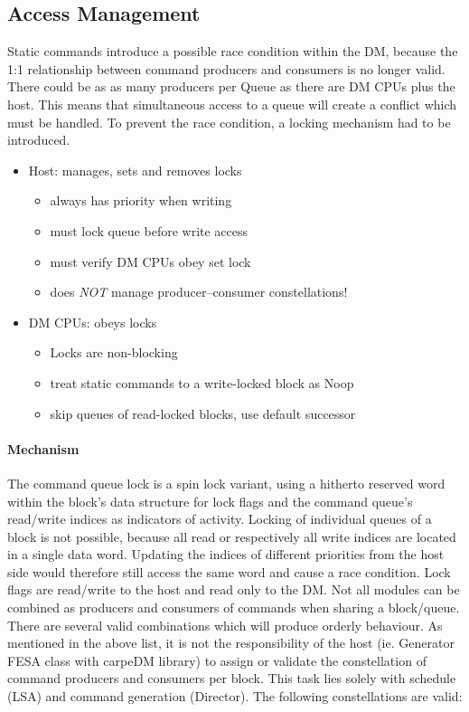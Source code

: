 \subsection{Access Management}
\label{ssec:locks}
Static commands introduce a possible race condition within the DM, because the 1:1 relationship between command producers and consumers is no longer valid. There could be as as many producers per Queue as there are DM CPUs plus the host. This means that simultaneous access to a queue will create a conflict which must be handled. To prevent the race condition, a locking mechanism had to be introduced.
\begin{itemize}
  \item{Host: manages, sets and removes locks}
  \begin{itemize}
    \item{always has priority when writing}
    \item{must lock queue before write access}
    \item{must verify DM CPUs obey set lock}
    \item{does \emph{NOT} manage producer--consumer constellations!}
  \end{itemize}
  \item{DM CPUs: obeys locks}
  \begin{itemize}
   \item{Locks are non-blocking}
   \item{treat static commands to a write-locked block as Noop}
   \item{skip queues of read-locked blocks, use default successor}
  \end{itemize}
\end{itemize}







\paragraph{Mechanism}
The command queue lock is a spin lock variant, using a hitherto reserved word within the block's data structure for lock flags and the command queue's read/write indices as indicators of activity.
Locking of individual queues of a block is not possible, because all read or respectively all write indices are located in a single data word. Updating the indices of different priorities from the host side would therefore still access the same word and cause a race condition. Lock flags are read/write to the host and read only to the DM.
Not all modules can be combined as producers and consumers of commands when sharing a block/queue. There are several valid combinations which will produce orderly behaviour.
As mentioned in the above list, it is not the responsibility of the host (ie. Generator FESA class with carpeDM library)
to assign or validate the constellation of command producers and consumers per block. This task lies solely with schedule (LSA) and command generation (Director). The following constellations are valid:


